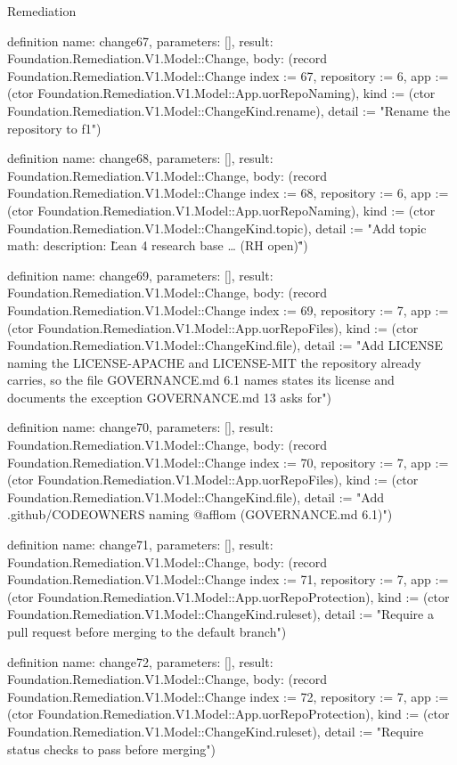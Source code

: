 \begin{lexlean}{Remediation}
\begin{semanticmodule}
definition{
  name: change67,
  parameters: [],
  result: Foundation.Remediation.V1.Model::Change,
  body: (record Foundation.Remediation.V1.Model::Change {index := 67, repository := 6, app := (ctor Foundation.Remediation.V1.Model::App.uorRepoNaming), kind := (ctor Foundation.Remediation.V1.Model::ChangeKind.rename), detail := "Rename the repository to f1"})
}

definition{
  name: change68,
  parameters: [],
  result: Foundation.Remediation.V1.Model::Change,
  body: (record Foundation.Remediation.V1.Model::Change {index := 68, repository := 6, app := (ctor Foundation.Remediation.V1.Model::App.uorRepoNaming), kind := (ctor Foundation.Remediation.V1.Model::ChangeKind.topic), detail := "Add topic math: description: \"Lean 4 research base … (RH open)\""})
}

definition{
  name: change69,
  parameters: [],
  result: Foundation.Remediation.V1.Model::Change,
  body: (record Foundation.Remediation.V1.Model::Change {index := 69, repository := 7, app := (ctor Foundation.Remediation.V1.Model::App.uorRepoFiles), kind := (ctor Foundation.Remediation.V1.Model::ChangeKind.file), detail := "Add LICENSE naming the LICENSE-APACHE and LICENSE-MIT the repository already carries, so the file GOVERNANCE.md 6.1 names states its license and documents the exception GOVERNANCE.md 13 asks for"})
}

definition{
  name: change70,
  parameters: [],
  result: Foundation.Remediation.V1.Model::Change,
  body: (record Foundation.Remediation.V1.Model::Change {index := 70, repository := 7, app := (ctor Foundation.Remediation.V1.Model::App.uorRepoFiles), kind := (ctor Foundation.Remediation.V1.Model::ChangeKind.file), detail := "Add .github/CODEOWNERS naming @afflom (GOVERNANCE.md 6.1)"})
}

definition{
  name: change71,
  parameters: [],
  result: Foundation.Remediation.V1.Model::Change,
  body: (record Foundation.Remediation.V1.Model::Change {index := 71, repository := 7, app := (ctor Foundation.Remediation.V1.Model::App.uorRepoProtection), kind := (ctor Foundation.Remediation.V1.Model::ChangeKind.ruleset), detail := "Require a pull request before merging to the default branch"})
}

definition{
  name: change72,
  parameters: [],
  result: Foundation.Remediation.V1.Model::Change,
  body: (record Foundation.Remediation.V1.Model::Change {index := 72, repository := 7, app := (ctor Foundation.Remediation.V1.Model::App.uorRepoProtection), kind := (ctor Foundation.Remediation.V1.Model::ChangeKind.ruleset), detail := "Require status checks to pass before merging"})
}


\end{semanticmodule}
\end{lexlean}
